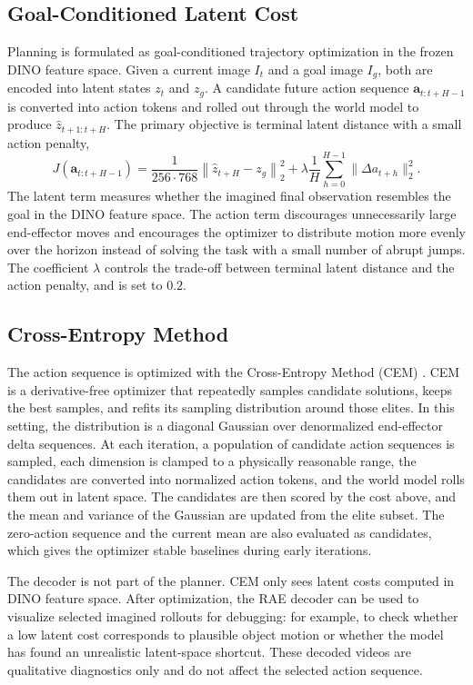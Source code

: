 \documentclass[12pt]{report}
\begin{document}
\subsection{Goal-Conditioned Latent Cost}
Planning is formulated as goal-conditioned trajectory optimization in the frozen DINO feature space. Given a current image $I_t$ and a goal image $I_g$, both are encoded into latent states $z_t$ and $z_g$. A candidate future action sequence $\mathbf{a}_{t:t+H-1}$ is converted into action tokens and rolled out through the world model to produce $\hat{z}_{t+1:t+H}$. The primary objective is terminal latent distance with a small action penalty,
\begin{equation}
\label{eq:planning-objective}
J(\mathbf{a}_{t:t+H-1}) =
\frac{1}{256\cdot768}
\left\|
\hat{z}_{t+H} - z_g
\right\|_2^2
+
\lambda
\frac{1}{H}
\sum_{h=0}^{H-1}
\| \Delta a_{t+h} \|_2^2 .
\end{equation}
The latent term measures whether the imagined final observation resembles the goal in the DINO feature space. The action term discourages unnecessarily large end-effector moves and encourages the optimizer to distribute motion more evenly over the horizon instead of solving the task with a small number of abrupt jumps. The coefficient $\lambda$ controls the trade-off between terminal latent distance and the action penalty, and is set to $0.2$.

\subsection{Cross-Entropy Method}
The action sequence is optimized with the Cross-Entropy Method (CEM) \cite{botev2013cem}. CEM is a derivative-free optimizer that repeatedly samples candidate solutions, keeps the best samples, and refits its sampling distribution around those elites. In this setting, the distribution is a diagonal Gaussian over denormalized end-effector delta sequences. At each iteration, a population of candidate action sequences is sampled, each dimension is clamped to a physically reasonable range, the candidates are converted into normalized action tokens, and the world model rolls them out in latent space. The candidates are then scored by the cost above, and the mean and variance of the Gaussian are updated from the elite subset. The zero-action sequence and the current mean are also evaluated as candidates, which gives the optimizer stable baselines during early iterations.

The decoder is not part of the planner. CEM only sees latent costs computed in DINO feature space. After optimization, the RAE decoder can be used to visualize selected imagined rollouts for debugging: for example, to check whether a low latent cost corresponds to plausible object motion or whether the model has found an unrealistic latent-space shortcut. These decoded videos are qualitative diagnostics only and do not affect the selected action sequence.
\end{document}
